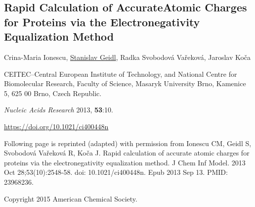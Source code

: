 \begin{center}
\section{\centering Rapid Calculation of AccurateAtomic Charges
for Proteins via the Electronegativity Equalization Method}

Crina-Maria Ionescu,
\underline{Stanislav Geidl},
Radka Svobodová Vařeková,
Jaroslav Koča

\vspace{1cm}

CEITEC--Central European Institute of Technology, and National
Centre for Biomolecular Research, Faculty of Science, Masaryk
University Brno, Kamenice 5, 625 00 Brno, Czech Republic.

\vspace{1cm}

\textit{Nucleic Acids Research} 2013, \textbf{53}:10.

\vspace{1cm}

\url{https://doi.org/10.1021/ci400448n}

\vspace{1cm}

Following page is reprinted (adapted) with permission from 
Ionescu CM, Geidl S, Svobodová Vařeková R, Koča J. Rapid calculation
of accurate atomic charges for proteins via the electronegativity
equalization method. J Chem Inf Model. 2013 Oct 28;53(10):2548-58.
doi: 10.1021/ci400448n. Epub 2013 Sep 13. PMID: 23968236.

Copyright 2015 American Chemical Society.

\end{center}




